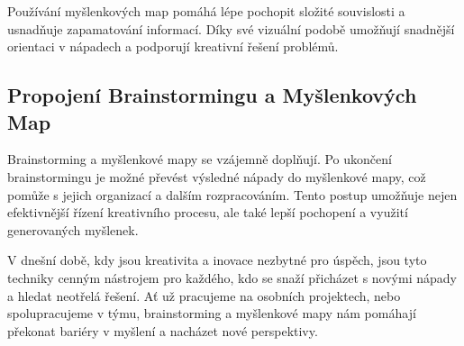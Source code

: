 Používání myšlenkových map pomáhá lépe pochopit složité souvislosti a usnadňuje zapamatování informací. Díky své vizuální podobě umožňují snadnější orientaci v nápadech a podporují kreativní řešení problémů. \cite{mindmapscom-2021}

\subsection{Propojení Brainstormingu a Myšlenkových Map}
Brainstorming a myšlenkové mapy se vzájemně doplňují. Po ukončení brainstormingu je možné převést výsledné nápady do myšlenkové mapy, což pomůže s jejich organizací a dalším rozpracováním. Tento postup umožňuje nejen efektivnější řízení kreativního procesu, ale také lepší pochopení a využití generovaných myšlenek.
\newline

V dnešní době, kdy jsou kreativita a inovace nezbytné pro úspěch, jsou tyto techniky cenným nástrojem pro každého, kdo se snaží přicházet s novými nápady a hledat neotřelá řešení. Ať už pracujeme na osobních projektech, nebo spolupracujeme v týmu, brainstorming a myšlenkové mapy nám pomáhají překonat bariéry v myšlení a nacházet nové perspektivy. \cite{brainstorming3, mindmapscom-2020}
